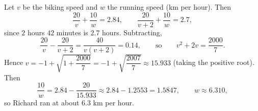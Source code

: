 Let $v$ be the biking speed and $w$ the running speed (km per hour). Then
\[\dfrac{20}{v}+\dfrac{10}{w}=2.84,\qquad\dfrac{20}{v+2}+\dfrac{10}{w}=2.7,\]
since $2$ hours $42$ minutes is $2.7$ hours. Subtracting,
\[\dfrac{20}{v}-\dfrac{20}{v+2}=\dfrac{40}{v(v+2)}=0.14,\qquad\text{so}\qquad v^2+2v=\dfrac{2000}{7}.\]
Hence $v=-1+\sqrt{1+\dfrac{2000}{7}}=-1+\sqrt{\dfrac{2007}{7}}\approx15.933$ (taking the positive root). Then
\[\dfrac{10}{w}=2.84-\dfrac{20}{15.933}\approx2.84-1.2553=1.5847,\qquad w\approx6.310,\]
so Richard ran at about $\boxed{6.3}$ km per hour.
